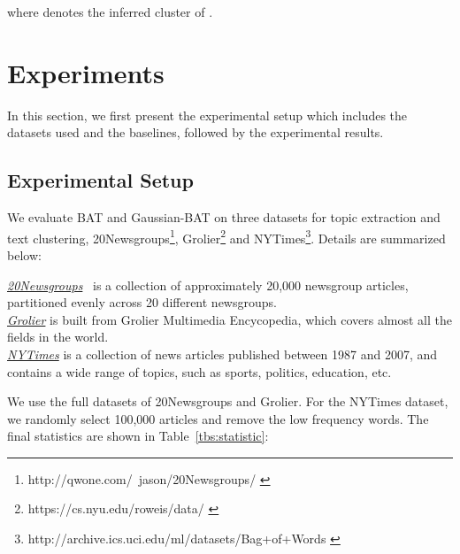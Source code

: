 \documentclass[11pt,a4paper]{article}
\begin{document}
where  denotes the inferred cluster of .

\section{Experiments}

In this section, we first present the experimental setup which includes the datasets used and the baselines, followed by the experimental results. 




\subsection{Experimental Setup}

We evaluate BAT and Gaussian-BAT on three datasets  for topic extraction and text clustering, 20Newsgroups\footnote{http://qwone.com/~jason/20Newsgroups/ \label{20news}}, Grolier\footnote{https://cs.nyu.edu/roweis/data/ \label{grolier}} and NYTimes\footnote{http://archive.ics.uci.edu/ml/datasets/Bag+of+Words \label{nytimes}}.  Details are summarized below:

\noindent\emph{\underline{20Newsgroups}}~\cite{Lang95} is a collection of approximately 20,000 newsgroup articles, partitioned evenly across 20 different newsgroups.  \\
\noindent\underline{\emph{Grolier}} is built from Grolier Multimedia Encycopedia, which covers almost all the fields in the world.\\
\noindent\underline{\emph{NYTimes}} is a collection of news articles published between 1987 and 2007, and contains a wide range of topics, such as sports, politics, education, etc.

We use the full datasets of 20Newsgroups and Grolier. For the NYTimes dataset, we randomly select 100,000 articles and remove the low frequency words. The final statistics are shown in Table~\ref{tbs:statistic}:

\begin{table}[h]
\centering
\small
{}
\caption{The statistics of datasets.}
\label{tbs:statistic}
\end{table}
\end{document}
